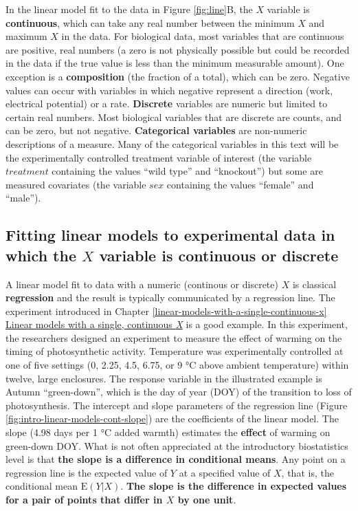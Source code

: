 \documentclass[]{book}
\begin{document}
In the linear model fit to the data in Figure \ref{fig:line}B, the \(X\) variable is \textbf{continuous}, which can take any real number between the minimum \(X\) and maximum \(X\) in the data. For biological data, most variables that are continuous are positive, real numbers (a zero is not physically possible but could be recorded in the data if the true value is less than the minimum measurable amount). One exception is a \textbf{composition} (the fraction of a total), which can be zero. Negative values can occur with variables in which negative represent a direction (work, electrical potential) or a rate. \textbf{Discrete} variables are numeric but limited to certain real numbers. Most biological variables that are discrete are counts, and can be zero, but not negative. \textbf{Categorical variables} are non-numeric descriptions of a measure. Many of the categorical variables in this text will be the experimentally controlled treatment variable of interest (the variable \(treatment\) containing the values ``wild type'' and ``knockout'') but some are measured covariates (the variable \(sex\) containing the values ``female'' and ``male'').

\hypertarget{fitting-linear-models-to-experimental-data-in-which-the-x-variable-is-continuous-or-discrete}{%
\subsection{\texorpdfstring{Fitting linear models to experimental data in which the \(X\) variable is continuous or discrete}{Fitting linear models to experimental data in which the X variable is continuous or discrete}}\label{fitting-linear-models-to-experimental-data-in-which-the-x-variable-is-continuous-or-discrete}}

A linear model fit to data with a numeric (continous or discrete) \(X\) is classical \textbf{regression} and the result is typically communicated by a regression line. The experiment introduced in Chapter \ref{linear-models-with-a-single-continuous-x} \protect\hyperlink{linear-models-with-a-single-continuous-x}{Linear models with a single, continuous \emph{X}} is a good example. In this experiment, the researchers designed an experiment to measure the effect of warming on the timing of photosynthetic activity. Temperature was experimentally controlled at one of five settings (0, 2.25, 4.5, 6.75, or 9 °C above ambient temperature) within twelve, large enclosures. The response variable in the illustrated example is Autumn ``green-down'', which is the day of year (DOY) of the transition to loss of photosynthesis. The intercept and slope parameters of the regression line (Figure \ref{fig:intro-linear-models-cont-slope}) are the coefficients of the linear model. The slope (4.98 days per 1 °C added warmth) estimates the \textbf{effect} of warming on green-down DOY. What is not often appreciated at the introductory biostatistics level is that \textbf{the slope is a difference in conditional means}. Any point on a regression line is the expected value of \(Y\) at a specified value of \(X\), that is, the conditional mean \(\mathrm{E}(Y|X)\). \textbf{The slope is the difference in expected values for a pair of points that differ in \(X\) by one unit}.
\end{document}
